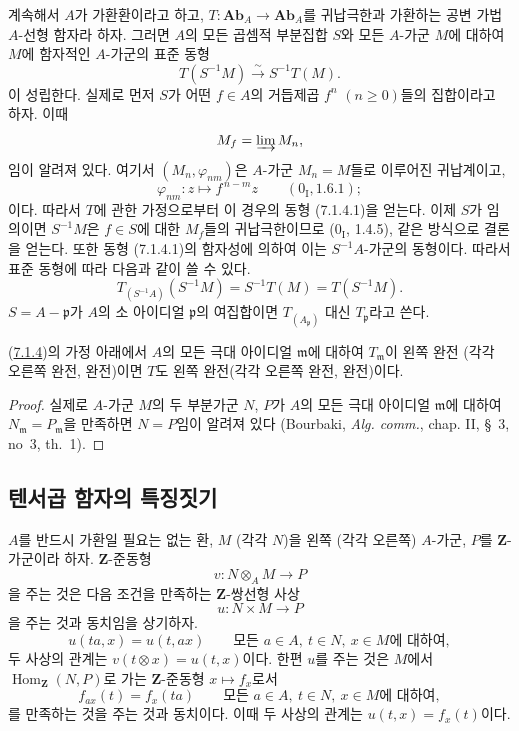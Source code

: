 \begin{env}[7.1.4]
\label{III.7.1.4-fr}
계속해서 $A$가 가환환이라고 하고,
$T:\mathbf{Ab}_A\to\mathbf{Ab}_A$를 귀납극한과 가환하는 공변 가법
$A$-선형 함자라 하자. 그러면 $A$의 모든 곱셈적 부분집합 $S$와 모든
$A$-가군 $M$에 대하여 $M$에 함자적인 $A$-가군의 표준 동형
\[
  T(S^{-1}M)\xrightarrow{\sim}S^{-1}T(M).
  \tag{7.1.4.1}\label{III.7.1.4.1.fr}
\]
이 성립한다. 실제로 먼저 $S$가 어떤 $f\in A$의 거듭제곱
$f^n$ $(n\geqslant0)$들의 집합이라고 하자. 이때
\[
  M_f=\varinjlim M_n,
\]
임이 알려져 있다. 여기서 $(M_n,\varphi_{nm})$은 $A$-가군
$M_n=M$들로 이루어진 귀납계이고,
\[
  \varphi_{nm}:z\longmapsto f^{\,n-m}z
  \qquad(0_{\mathrm I}, 1.6.1);
\]
이다. 따라서 $T$에 관한 가정으로부터 이 경우의 동형
(7.1.4.1)을 얻는다. 이제 $S$가 임의이면 $S^{-1}M$은 $f\in S$에
대한 $M_f$들의 귀납극한이므로 ($0_{\mathrm I}$, 1.4.5), 같은 방식으로
결론을 얻는다. 또한 동형 (7.1.4.1)의 함자성에 의하여 이는
$S^{-1}A$-가군의 동형이다. 따라서 표준 동형에 따라 다음과 같이
쓸 수 있다.
\[
  T_{(S^{-1}A)}(S^{-1}M)
  =
  S^{-1}T(M)
  =
  T(S^{-1}M).
  \tag{7.1.4.2}\label{III.7.1.4.2.fr}
\]
$S=A-\mathfrak p$가 $A$의 소 아이디얼 $\mathfrak p$의 여집합이면
$T_{(A_{\mathfrak p})}$ 대신 $T_{\mathfrak p}$라고 쓴다.
\end{env}

\begin{proposition}[7.1.5]
\label{III.7.1.5-fr}
(\hyperref[III.7.1.4-fr]{7.1.4})의 가정 아래에서 $A$의 모든 극대
아이디얼 $\mathfrak m$에 대하여 $T_{\mathfrak m}$이 왼쪽 완전
(각각 오른쪽 완전, 완전)이면 $T$도 왼쪽 완전(각각 오른쪽 완전,
완전)이다.
\end{proposition}

\begin{proof}
실제로 $A$-가군 $M$의 두 부분가군 $N$, $P$가 $A$의 모든 극대
아이디얼 $\mathfrak m$에 대하여
$N_{\mathfrak m}=P_{\mathfrak m}$을 만족하면 $N=P$임이 알려져 있다
(Bourbaki, \emph{Alg. comm.}, chap. II, \S~3, no~3, th.~1).
\end{proof}

\subsection{텐서곱 함자의 특징짓기}
\label{subsection:III.7.2.fr}

\begin{env}[7.2.1]
\label{III.7.2.1-fr}
$A$를 반드시 가환일 필요는 없는 환, $M$ (각각 $N$)을 왼쪽
(각각 오른쪽) $A$-가군, $P$를 $\mathbf Z$-가군이라 하자.
$\mathbf Z$-준동형
\[
  v:N\otimes_A M\longrightarrow P
\]
을 주는 것은 다음 조건을 만족하는 $\mathbf Z$-쌍선형 사상
\[
  u:N\times M\longrightarrow P
\]
을 주는 것과 동치임을 상기하자.
\[
  u(ta,x)=u(t,ax)
  \qquad\text{모든 }a\in A,\ t\in N,\ x\in M\text{에 대하여},
\]
두 사상의 관계는 $v(t\otimes x)=u(t,x)$이다. 한편 $u$를 주는 것은
$M$에서 $\operatorname{Hom}_{\mathbf Z}(N,P)$로 가는
$\mathbf Z$-준동형 $x\mapsto f_x$로서
\[
  f_{ax}(t)=f_x(ta)
  \qquad\text{모든 }a\in A,\ t\in N,\ x\in M\text{에 대하여},
\]
를 만족하는 것을 주는 것과 동치이다. 이때 두 사상의 관계는
$u(t,x)=f_x(t)$이다.
\end{env}

